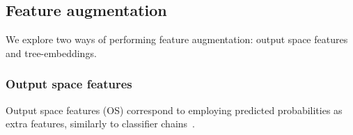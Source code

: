 \documentclass[conference,compsoc]{IEEEtran}
\begin{document}



\subsection{Feature augmentation}
\label{sec:feature augmentation}

We explore two ways of performing feature augmentation: output space features and tree-embeddings. 

\subsubsection{Output space features}


Output space features (OS) correspond to employing predicted probabilities as extra features, similarly to classifier chains~\cite{read2021classifier}.









\end{document}
